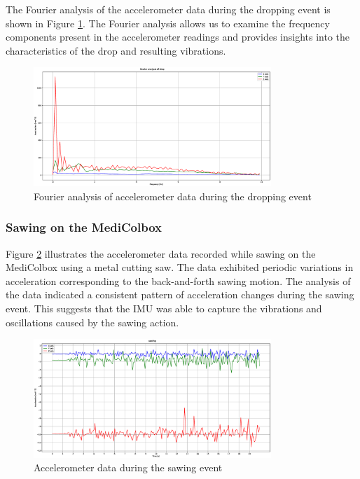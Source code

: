 \documentclass[../main.tex]{subfiles}
\begin{document}
The Fourier analysis of the accelerometer data during the
dropping event is shown in
Figure \ref{fig:fourier_accelerometer_dropping}.
The Fourier analysis allows us to examine the
frequency components present in the accelerometer readings and
provides insights into the characteristics of the
drop and resulting vibrations.

\begin{figure}[htbp]
    \centering
    \includegraphics[width=0.8\textwidth]{resources/figures/Fourier_acceleration_drop.eps}
    \caption{Fourier analysis of accelerometer data during the dropping event}
    \label{fig:fourier_accelerometer_dropping}
\end{figure}

\clearpage

\subsubsection{Sawing on the MediColbox}

Figure \ref{fig:accelerometer_sawing} illustrates the
accelerometer data recorded while sawing on the
MediColbox using a metal cutting saw.
The data exhibited periodic variations in acceleration
corresponding to the back-and-forth sawing motion.
The analysis of the data indicated a consistent pattern of
acceleration changes during the sawing event. This suggests that the IMU was able to capture the vibrations and oscillations caused by the sawing action.

\begin{figure}[htbp]
    \centering
    \includegraphics[width=0.8\textwidth]{resources/figures/Acceleration_sawing.eps}
    \caption{Accelerometer data during the sawing event}
    \label{fig:accelerometer_sawing}
\end{figure}
\end{document}
